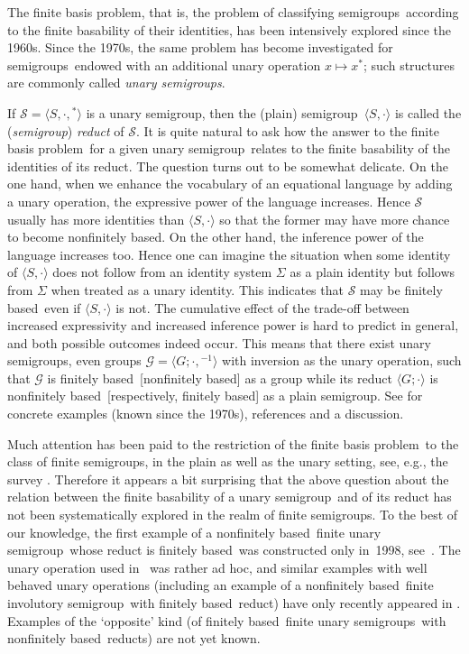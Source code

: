 \documentclass[smallextended]{svjour3}
\newcommand{\sgp}{semi\-group}
\newcommand{\sgps}{semi\-groups}
\newcommand{\fis}{finite involutory semi\-group}
\newcommand{\fss}{finite \sgps}
\newcommand{\fus}{finite unary \sgp}
\newcommand{\fuss}{finite unary \sgps}
\newcommand{\fb}{finitely based}
\newcommand{\fbp}{finite basis problem}
\newcommand{\nfb}{non\-finitely based}
\begin{document}
The \fbp, that is, the problem of classifying \sgps\ according to the finite basability of their identities, has been intensively explored
since the 1960s. Since the 1970s, the same problem has become investigated for \sgps\ endowed with an additional unary operation $x\mapsto
x^*$; such structures are commonly called \emph{unary \sgps}.

If $\mathcal{S}=\langle S,\cdot,{}^*\rangle$ is a unary \sgp, then the (plain) \sgp\ $\langle S,\cdot\rangle$ is called the (\emph{\sgp})
\emph{reduct} of $\mathcal{S}$. It is quite natural to ask how the answer to the \fbp\ for a given unary \sgp\ relates to the finite
basability of the identities of its reduct. The question turns out to be somewhat delicate. On the one hand, when we enhance the vocabulary
of an equational language by adding a unary operation, the expressive power of the language increases. Hence $\mathcal{S}$ usually has more
identities than $\langle S,\cdot\rangle$ so that the former may have more chance to become \nfb. On the other hand, the inference power of
the language increases too. Hence one can imagine the situation when some identity of $\langle S,\cdot\rangle$  does not follow from an
identity system $\Sigma$ as a plain identity but follows from $\Sigma$ when treated as a unary identity. This indicates that $\mathcal{S}$
may be \fb\ even if $\langle S,\cdot\rangle$ is not. The cumulative effect of the trade-off between increased expressivity and increased
inference power is hard to predict in general, and both possible outcomes indeed occur. This means that there exist unary \sgps, even
groups $\mathcal{G}=\langle G;\cdot,{}^{-1}\rangle$ with inversion as the unary operation, such that $\mathcal{G}$ is \fb\ [\nfb] as a
group while its reduct $\langle G;\cdot\rangle$ is \nfb\ [respectively, \fb] as a plain \sgp. See \cite[Section~2]{Volkov:2001} for
concrete examples (known since the 1970s), references and a discussion.

Much attention has been paid to the restriction of the \fbp\ to the class of \fss, in the plain as well as the unary setting, see, e.g.,
the survey \cite{Volkov:2001}. Therefore it appears a bit surprising that the above question about the relation between the finite
basability of a unary \sgp\ and of its reduct has not been systematically explored in the realm of \fss. To the best of our knowledge, the
first example of a \nfb\ \fus\ whose reduct is \fb\ was constructed only in~1998, see~\cite{Lawrence&Willard:1998}. The unary operation
used in~\cite{Lawrence&Willard:1998} was rather ad hoc, and similar examples with well behaved unary operations (including an example of a
\nfb\ \fis\ with \fb\ reduct) have only recently appeared in \cite{Jackson&Volkov:2010}. Examples of the `opposite' kind (of \fb\ \fuss\
with \nfb\ reducts) are not yet known.
\end{document}
